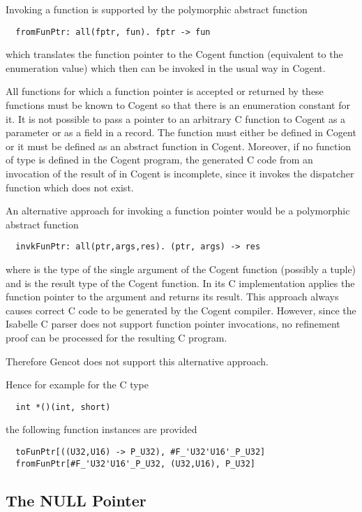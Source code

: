 Invoking a function is supported by the polymorphic abstract function
\begin{verbatim}
  fromFunPtr: all(fptr, fun). fptr -> fun
\end{verbatim}
which translates the function pointer to the Cogent function (equivalent to the enumeration value) which
then can be invoked in the usual way in Cogent. 

All functions for which a function pointer is accepted or returned by these functions must be known to
Cogent so that there is an enumeration constant for it. It is not possible to pass a pointer to an arbitrary 
C function to Cogent as a parameter or as a field in a record. The function must either be defined in Cogent 
or it must be defined as an abstract function 
in Cogent. Moreover, if no function of type  is defined in the Cogent program, the
generated C code from an invocation of the result of  in Cogent is incomplete, 
since it invokes the dispatcher function which does not exist.

An alternative approach for invoking a function pointer would be a polymorphic abstract function 
\begin{verbatim}
  invkFunPtr: all(ptr,args,res). (ptr, args) -> res
\end{verbatim}
where  is the type of the single argument of the Cogent function (possibly a tuple) and 
is the result type of the Cogent function. In its C implementation  applies the function pointer
to the argument and returns its result. 
This approach always causes correct C code to be generated by the Cogent compiler. However, since the Isabelle
C parser does not support function pointer invocations, no refinement proof can be processed for the resulting
C program.

Therefore Gencot does not support this alternative approach.

Hence for example for the C type
\begin{verbatim}
  int *()(int, short)
\end{verbatim}
the following function instances are provided
\begin{verbatim}
  toFunPtr[((U32,U16) -> P_U32), #F_'U32'U16'_P_U32]
  fromFunPtr[#F_'U32'U16'_P_U32, (U32,U16), P_U32]
\end{verbatim}

\subsection{The NULL Pointer}
\label{design-operations-null}

